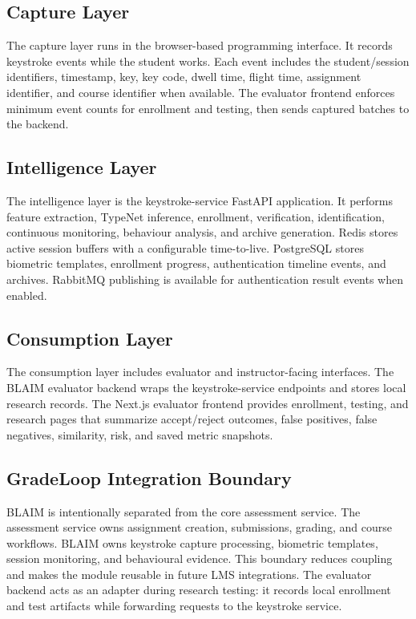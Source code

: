 \subsection{Capture Layer}
\label{subsec:capture-layer}

The capture layer runs in the browser-based programming interface. It records keystroke events while the student works. Each event includes the student/session identifiers, timestamp, key, key code, dwell time, flight time, assignment identifier, and course identifier when available. The evaluator frontend enforces minimum event counts for enrollment and testing, then sends captured batches to the backend.

\subsection{Intelligence Layer}
\label{subsec:intelligence-layer}

The intelligence layer is the keystroke-service FastAPI application. It performs feature extraction, TypeNet inference, enrollment, verification, identification, continuous monitoring, behaviour analysis, and archive generation. Redis stores active session buffers with a configurable time-to-live. PostgreSQL stores biometric templates, enrollment progress, authentication timeline events, and archives. RabbitMQ publishing is available for authentication result events when enabled.

\subsection{Consumption Layer}
\label{subsec:consumption-layer}

The consumption layer includes evaluator and instructor-facing interfaces. The BLAIM evaluator backend wraps the keystroke-service endpoints and stores local research records. The Next.js evaluator frontend provides enrollment, testing, and research pages that summarize accept/reject outcomes, false positives, false negatives, similarity, risk, and saved metric snapshots.

\subsection{GradeLoop Integration Boundary}
\label{subsec:gradeloop-boundary}

BLAIM is intentionally separated from the core assessment service. The assessment service owns assignment creation, submissions, grading, and course workflows. BLAIM owns keystroke capture processing, biometric templates, session monitoring, and behavioural evidence. This boundary reduces coupling and makes the module reusable in future LMS integrations. The evaluator backend acts as an adapter during research testing: it records local enrollment and test artifacts while forwarding requests to the keystroke service.

